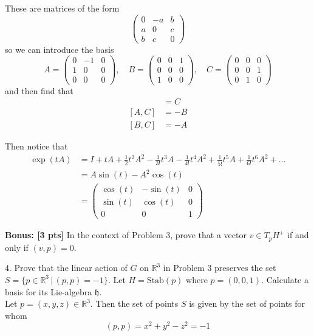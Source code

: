 \documentclass[11pt]{article}
\newcommand{\R}{\mathbb{R}}
\newcommand{\Stab}{\text{Stab}}
\begin{document}
		These are matrices of the form 
		\[\begin{pmatrix}
			0 & -a & b\\
			a & 0 & c\\
			b & c & 0
		\end{pmatrix}\]
		so we can introduce the basis 
		\[A = \begin{pmatrix}
			0 & -1 & 0\\
			1 & 0 & 0\\
			0 & 0 & 0
		\end{pmatrix}, \quad B = \begin{pmatrix}
			0 & 0 & 1\\
			0 & 0 & 0\\
			1 & 0 & 0
		\end{pmatrix}, \quad C = \begin{pmatrix}
			0 & 0 & 0\\
			0 & 0 & 1\\
			0 & 1 & 0
		\end{pmatrix}\]
		and then find that 
		\begin{align*}
			[A, B] &= C\\
			[A, C] &= -B\\
			[B, C] &= -A
		\end{align*}

		Then notice that 
		\begin{align*}
			\exp(tA) &= I + tA + \frac{1}{2}t^2A^2 - \frac{1}{3!}t^3A - \frac{1}{4!}t^4A^2 + \frac{1}{5!}t^5A + \frac{1}{6!}t^6A^2 + \dots\\ 
				&= A\sin(t) - A^2\cos(t)\\ 
				&= \begin{pmatrix}
					\cos(t) & -\sin(t) & 0\\
					\sin(t) & \cos(t) & 0\\
					0 & 0 & 1
				\end{pmatrix}
		\end{align*} 
	\color{black}

\textbf{Bonus: [3 pts]}  In the context of Problem 3, prove that a vector $v \in T_{p}H^{+}$ if and only if $(v,p) = 0$. 
\pagebreak

4.  Prove that the linear action of $G$ on $\R^{3}$ in Problem 3 preserves the set $S = \{p \in \R^{3} \, | \, (p,p) = -1\}$.  Let $H = \Stab(p)$ where $p = (0,0,1)$.  Calculate a basis for its Lie-algebra $\mathfrak{h}$.\\

	\color{blue}
		Let $p = (x, y, z) \in \R^3$. Then the set of points $S$ is given by the set of points for whom 
		\[(p, p) = x^2 + y^2 - z^2 = -1\]
\end{document}
